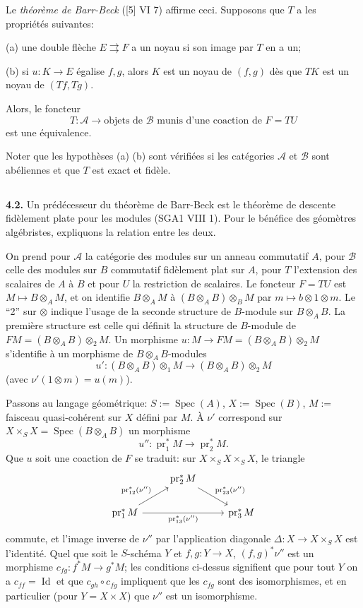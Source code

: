 \documentclass[12pt,a4paper]{article}
\theoremstyle{plain}
\theoremstyle{definition}
\theoremstyle{remark}
\DeclareMathOperator{\Spec}{Spec}
\DeclareMathOperator{\Id}{Id}
\DeclareMathOperator{\pr}{pr}
\begin{document}
Le \emph{théorème de Barr-Beck} ([5] VI 7) affirme ceci. Supposons que $T$ a les propriétés suivantes:

(a) une double flèche $E \rightrightarrows F$ a un noyau si son image par $T$ en a un;

(b) si $u : K \to E$ égalise $f,g$, alors $K$ est un noyau de $(f,g)$ dès que $TK$ est un noyau de $(Tf,Tg)$.

Alors, le foncteur
\[
T : \mathcal{A} \longrightarrow \text{objets de $\mathcal{B}$ munis d'une coaction de $F = TU$}
\]
est une équivalence.

Noter que les hypothèses (a) (b) sont vérifiées si les catégories $\mathcal{A}$ et $\mathcal{B}$ sont abéliennes et que $T$ est exact et fidèle.

\subsection{}

\textbf{4.2.} Un prédécesseur du théorème de Barr-Beck est le théorème de descente fidèlement plate pour les modules (SGA1 VIII 1). Pour le bénéfice des géomètres algébristes, expliquons la relation entre les deux.

On prend pour $\mathcal{A}$ la catégorie des modules sur un anneau commutatif $A$, pour $\mathcal{B}$ celle des modules sur $B$ commutatif fidèlement plat sur $A$, pour $T$ l'extension des scalaires de $A$ à $B$ et pour $U$ la restriction de scalaires. Le foncteur $F = TU$ est $M \mapsto B \otimes_A M$, et on identifie $B \otimes_A M$ à $(B \otimes_A B) \otimes_B M$ par $m \mapsto b \otimes 1 \otimes m$. Le ``2'' sur $\otimes$ indique l'usage de la seconde structure de $B$-module sur $B \otimes_A B$. La première structure est celle qui définit la structure de $B$-module de $FM = (B \otimes_A B) \otimes_2 M$. Un morphisme $u : M \to FM = (B \otimes_A B) \otimes_2 M$ s'identifie à un morphisme de $B \otimes_A B$-modules
\[
u' : (B \otimes_A B) \otimes_1 M \to (B \otimes_A B) \otimes_2 M
\]
(avec $\nu'(1 \otimes m) = u(m)$).

Passons au langage géométrique: $S := \Spec(A)$, $X := \Spec(B)$, $M :=$ faisceau quasi-cohérent sur $X$ défini par $M$. À $\nu'$ correspond sur $X \times_S X = \Spec(B \otimes_A B)$ un morphisme
\[
u'' : \pr_1^* M \to \pr_2^* M.
\]
Que $u$ soit une coaction de $F$ se traduit: sur $X \times_S X \times_S X$, le triangle
\[
\begin{tikzcd}
& \pr_2^* M \arrow[rd, "\pr_{23}^*(\nu'')"] & \\
\pr_1^* M \arrow[ru, "\pr_{12}^*(\nu'')"] \arrow[rr, "\pr_{13}^*(\nu'')"'] & & \pr_3^* M
\end{tikzcd}
\]
commute, et l'image inverse de $\nu''$ par l'application diagonale $\Delta : X \to X \times_S X$ est l'identité. Quel que soit le $S$-schéma $Y$ et $f,g : Y \to X$, $(f,g)^*\nu''$ est un morphisme $c_{fg} : f^*M \to g^*M$; les conditions ci-dessus signifient que pour tout $Y$ on a $c_{ff} = \Id$ et que $c_{gh} \circ c_{fg}$ impliquent que les $c_{fg}$ sont des isomorphismes, et en particulier (pour $Y = X \times X$) que $\nu''$ est un isomorphisme.
\end{document}

